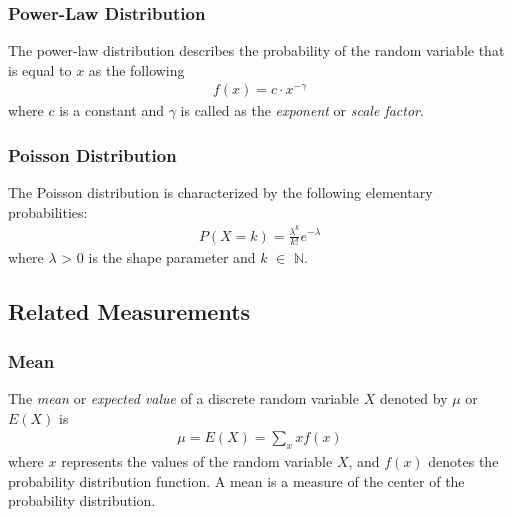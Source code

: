 \subsubsection{Power-Law Distribution}


The power-law distribution describes the probability of the random variable that is equal to $x$ as the following
\begin{align}
	f(x) = c\cdot x^{-\gamma}
\end{align}
where $c$ is a constant and $\gamma$ is called as the \textit{exponent} or \textit{scale factor}.

\subsubsection{Poisson Distribution}
The Poisson distribution is characterized by the following elementary probabilities:
\begin{align}
	P(X = k) = \frac{\lambda^k}{k!}e^{-\lambda}
\end{align}
where $\lambda$ > 0 is the shape parameter and $k$ $\in$ $\mathbb{N}$.


\subsection{Related Measurements}

\subsubsection{Mean}
The \textit{mean} or \textit{expected value} of a discrete random variable $X$ denoted by $\mu$ or $E(X)$ is
\begin{align}
	\mu = E(X) = \sum_{x} xf(x)
\end{align}
where $x$ represents the values of the random variable $X$, and $f(x)$ denotes the probability distribution function. A mean is a measure of the center of the probability distribution.

